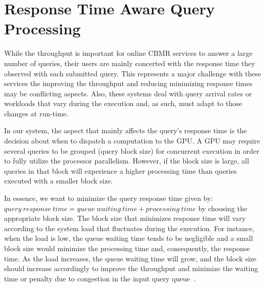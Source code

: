 \section{Response Time Aware Query Processing}
\label{sec:query-rate-aware}

While the throughput is important for online CBMR services to answer a large number 
of queries, their users are mainly concerted with the response time they observed with
each submitted query. This represents a major challenge with these services 
the improving the throughput and reducing minimizing response times may be conflicting
aspects. Also, these systems deal with query arrival rates or workloads that vary 
during the execution and, as such, must adapt to those changes at run-time.


In our system, the aspect that mainly affects the query's response time is 
the decision about when to dispatch a computation to the GPU. A GPU may 
require several queries to be grouped (query block size) for concurrent execution
in order to fully utilize the processor parallelism. However, if the block size 
is large, all queries in that block will experience a higher processing 
time than queries executed with a smaller block size.


In essence, we want to minimize the query response time given 
by: $query\ response\ time = queue\ waiting\ time + processing\ time$ by choosing the 
appropriate block size. The block size that minimizes response time will 
vary according to the system load that fluctuates during the execution. For instance,
when the load is low, the queue waiting time tends to be negligible and a small block 
size would minimize the processing time and, consequently, the response time. 
As the load increases, the queue waiting time will grow, and the block size 
should increase accordingly to improve the throughput and minimize the waiting 
time or penalty due to congestion in the input query queue~\cite{Menasce:2001:CPW:560806}. 



